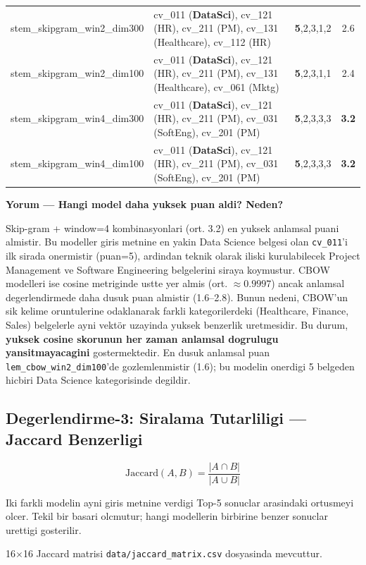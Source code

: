 \documentclass[12pt, a4paper]{article}
\begin{document}
\begin{table}[H]
\begin{tabularx}{\textwidth}{l X c c}
stem\_skipgram\_win2\_dim300 & cv\_011 (\textbf{DataSci}), cv\_121 (HR), cv\_211 (PM), cv\_131 (Healthcare), cv\_112 (HR) & \textbf{5},2,3,1,2 & 2.6 \\
stem\_skipgram\_win2\_dim100 & cv\_011 (\textbf{DataSci}), cv\_121 (HR), cv\_211 (PM), cv\_131 (Healthcare), cv\_061 (Mktg) & \textbf{5},2,3,1,1 & 2.4 \\
stem\_skipgram\_win4\_dim300 & cv\_011 (\textbf{DataSci}), cv\_121 (HR), cv\_211 (PM), cv\_031 (SoftEng), cv\_201 (PM) & \textbf{5},2,3,3,3 & \textbf{3.2} \\
stem\_skipgram\_win4\_dim100 & cv\_011 (\textbf{DataSci}), cv\_121 (HR), cv\_211 (PM), cv\_031 (SoftEng), cv\_201 (PM) & \textbf{5},2,3,3,3 & \textbf{3.2} \\
\bottomrule
\end{tabularx}
\end{table}

\textbf{Yorum --- Hangi model daha yuksek puan aldi? Neden?}

Skip-gram + window=4 kombinasyonlari (ort. 3.2) en yuksek anlamsal puani almistir.
Bu modeller giris metnine en yakin Data Science belgesi olan \texttt{cv\_011}'i ilk sirada onermistir (puan=5),
ardindan teknik olarak iliski kurulabilecek Project Management ve Software Engineering belgelerini siraya koymustur.
CBOW modelleri ise cosine metriginde ustte yer almis (ort. $\approx 0.9997$) ancak anlamsal degerlendirmede
daha dusuk puan almistir (1.6--2.8). Bunun nedeni, CBOW'un sik kelime oruntulerine odaklanarak farkli
kategorilerdeki (Healthcare, Finance, Sales) belgelerle ayni vektör uzayinda yuksek benzerlik uretmesidir.
Bu durum, \textbf{yuksek cosine skorunun her zaman anlamsal dogrulugu yansitmayacagini} gostermektedir.
En dusuk anlamsal puan \texttt{lem\_cbow\_win2\_dim100}'de gozlemlenmistir (1.6); bu modelin onerdigi
5 belgeden hicbiri Data Science kategorisinde degildir.

\subsection{Degerlendirme-3: Siralama Tutarliligi --- Jaccard Benzerligi}

\[
\text{Jaccard}(A, B) = \frac{|A \cap B|}{|A \cup B|}
\]

Iki farkli modelin ayni giris metnine verdigi Top-5 sonuclar arasindaki ortusmeyi olcer. Tekil bir basari olcmutur; hangi modellerin birbirine benzer sonuclar urettigi gosterilir.

16$\times$16 Jaccard matrisi \texttt{data/jaccard\_matrix.csv} dosyasinda mevcuttur.
\end{document}
